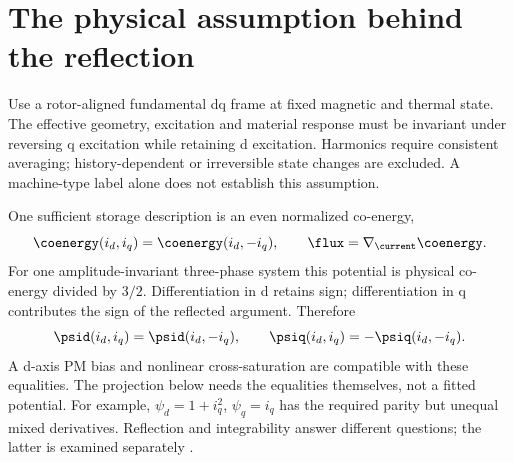 \section{The physical assumption behind the reflection}
\label{sec:symmetry}
Use a rotor-aligned fundamental dq frame at fixed magnetic and thermal state.
The effective geometry, excitation and material response must be invariant
under reversing q excitation while retaining d excitation. Harmonics require
consistent averaging; history-dependent or irreversible state changes are
excluded. A machine-type label alone does not establish this assumption.

One sufficient storage description is an even normalized co-energy,
\begin{equation}
 \coenergy(i_d,i_q)=\coenergy(i_d,-i_q),\qquad
 \flux=\nabla_{\current}\coenergy.\label{eq:energy-parity}
\end{equation}
For one amplitude-invariant three-phase system this potential is physical
co-energy divided by $3/2$. Differentiation in d retains sign; differentiation
in q contributes the sign of the reflected argument. Therefore
\begin{equation}
 \psid(i_d,i_q)=\psid(i_d,-i_q),\qquad
 \psiq(i_d,i_q)=-\psiq(i_d,-i_q).\label{eq:flux-parity}
\end{equation}
A d-axis PM bias and nonlinear cross-saturation are compatible with these
equalities. The projection below needs the equalities themselves, not a fitted
potential. For example, $\psi_d=1+i_q^2$, $\psi_q=i_q$ has the required parity
but unequal mixed derivatives. Reflection and integrability answer different
questions; the latter is examined separately \cite{companion-coenergy}.
